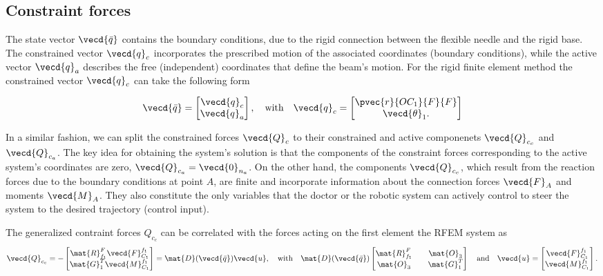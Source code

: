 \subsection{Constraint forces}
The state vector $\vecd{\bar{q}}$
contains the boundary conditions, due to the rigid connection between the
flexible needle and the rigid base. The constrained vector $\vecd{q}_{c}$
incorporates the prescribed motion of the associated coordinates
(boundary conditions), while the active vector $\vecd{q}_{a}$ describes the
free (independent) coordinates that define the beam's motion. For the
rigid finite element method the constrained vector
$\vecd{q}_{c}$ can take the following form

\begin{equation}
    \vecd{\bar{q}} = \begin{bmatrix}
        \vecd{q}_{c} \\ \vecd{q}_{a}
    \end{bmatrix}, \quad \text{with} \quad
    \vecd{q}_{c}=  \begin{bmatrix}
        \pvec{r}{OC_{1}}{F}{F} \\ \vecd{\theta}_{1}.
    \end{bmatrix}
    \label{eq:state_partitioning}
\end{equation}

In a similar fashion, we can split the constrained forces $\vecd{Q}_{c}$
to their constrained and active componenets ${\vecd{Q}_{c_c}}$ and 
$\vecd{Q}_{c_a}$. The key idea for obtaining the system's solution is
that the components of the constraint
forces corresponding to the active system's coordinates
are zero, $\vecd{Q}_{c_a} = \vecd{0}_{n_a}$.
On the other hand, the components $\vecd{Q}_{c_c}$, which result
from the reaction forces due to
the boundary conditions at point $A$, are finite and incorporate information
about the connection forces $\vecd{F}_{A}$ and moments
$\vecd{M}_{A}$. They also constitute the only variables that the 
doctor or the robotic system can actively control to steer the 
system to the desired trajectory (control input).

The generalized contraint forces $Q_{c_c}$ can be correlated with the
forces acting on the first element the RFEM system as
\[
    \vecd{Q}_{c_c} = - \begin{bmatrix}
    \mat{R}_{f_1}^{F} \vecd{F}_{C_{1}}^{f_{1}} \\
    \mat{G}_{1}^{T} \vecd{M}_{C_{1}}^{f_{1}}
    \end{bmatrix} = \mat{D}(\vecd{\bar{q}}) \vecd{u}, \quad \text{with} \quad 
    \mat{D}(\vecd{\bar{q}})
    \begin{bmatrix}
        \mat{R}_{f_1}^{F} && \mat{O}_{3} \\
        \mat{O}_{3} && \mat{G}_{1}^{T}
    \end{bmatrix}
    \quad \text{and} \quad \vecd{u} = \begin{bmatrix}
    \vecd{F}_{C_{1}}^{f_{1}} \\
    \vecd{M}_{C_{1}}^{f_{1}}
    \end{bmatrix}.
\]

